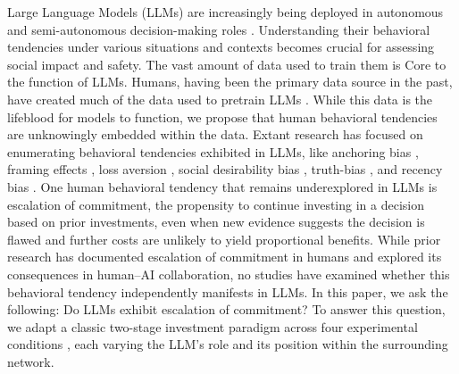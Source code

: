 \documentclass[letterpaper]{article} %
\begin{document}
Large Language Models (LLMs) are increasingly being deployed in autonomous and semi-autonomous decision-making roles \cite{Cui-2024, Liu-2025, Rajani-2025, Lin-2025, Nie-2025, Ren-2025, Raza-2025, Sha-2023}. Understanding their behavioral tendencies under various situations and contexts becomes crucial for assessing social impact and safety. The vast amount of data used to train them is Core to the function of LLMs. Humans, having been the primary data source in the past, have created much of the data used to pretrain LLMs \cite{brown-2020, grattafiori-2024}. While this data is the lifeblood for models to function, we propose that human behavioral tendencies are unknowingly embedded within the data. Extant research has focused on enumerating behavioral tendencies exhibited in LLMs, like anchoring bias \cite{Lou-2024}, framing effects \cite{Lior-2025}, loss aversion \cite{Jia-2024}, social desirability bias \cite{Salecha-2024}, truth-bias \cite{Barkett-2025, Markowitz-2023}, and recency bias \cite{Li-2024}. One human behavioral tendency that remains underexplored in LLMs is escalation of commitment, the propensity to continue investing in a decision based on prior investments, even when new evidence suggests the decision is flawed and further costs are unlikely to yield proportional benefits. While prior research has documented escalation of commitment in humans and explored its consequences in human–AI collaboration, no studies have examined whether this behavioral tendency independently manifests in LLMs. In this paper, we ask the following: Do LLMs exhibit escalation of commitment? To answer this question, we adapt a classic two-stage investment paradigm across four experimental conditions \cite{Staw-1976}, each varying the LLM's role and its position within the surrounding network.
\end{document}
